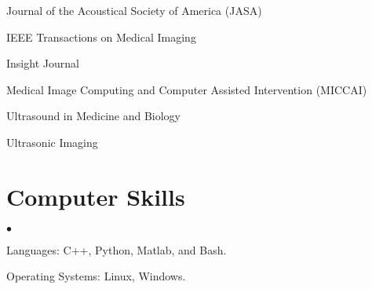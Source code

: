 \documentclass[margin,line]{res}
\newenvironment{list1}{
  \begin{list}{\ding{113}}{%
      \setlength{\itemsep}{0in}
      \setlength{\parsep}{0in} \setlength{\parskip}{0in}
      \setlength{\topsep}{0in} \setlength{\partopsep}{0in}
      \setlength{\leftmargin}{0.17in}}}{\end{list}}
\newenvironment{list2}{
  \begin{list}{$\bullet$}{%
      \setlength{\itemsep}{0in}
      \setlength{\parsep}{0in} \setlength{\parskip}{0in}
      \setlength{\topsep}{0in} \setlength{\partopsep}{0in}
      \setlength{\leftmargin}{0.2in}}}{\end{list}}
\begin{document}
\begin{resume}
\begin{list1}
\item[] Journal of the Acoustical Society of America (JASA)
\item[] IEEE Transactions on Medical Imaging
\item[] Insight Journal
\item[] Medical Image Computing and Computer Assisted Intervention (MICCAI)
\item[] Ultrasound in Medicine and Biology
\item[] Ultrasonic Imaging
\end{list1}

%
%
%
%

%
\section{\sc Computer Skills}
\begin{list2}
\item Languages:  C++, Python, Matlab, and Bash.
\item Operating Systems:  Linux, Windows.\\
\end{list2}
\vspace*{-.15in}


\end{resume}
\end{document}
